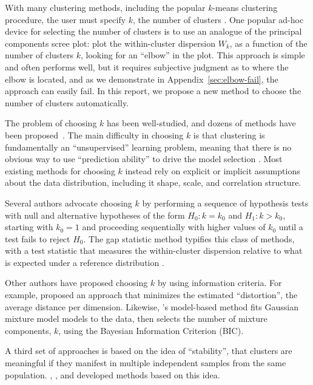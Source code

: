 \documentclass[12pt]{article}
\begin{document}
With many clustering methods, including the popular $k$-means clustering
procedure, the user must specify $k$, the number of clusters
\citep{jain2010data}.  One popular ad-hoc device for selecting the number of
clusters is to use an analogue of the principal components scree plot: plot
the within-cluster dispersion $W_k$, as a function of the number of clusters
$k$, looking for an ``elbow'' in the plot.  This approach is simple and often
performs well, but it requires subjective judgment as to where the elbow is
located, and as we demonstrate in Appendix~\ref{sec:elbow-fail}, the approach
can easily fail.  In this report, we propose a new method to choose the number
of clusters automatically.


The problem of choosing $k$ has been well-studied, and dozens of methods have
been proposed~\citep{chiang2010intelligent,fujita2014non}. The main difficulty
in choosing $k$ is that clustering is fundamentally an ``unsupervised''
learning problem, meaning that there is no obvious way to use ``prediction
ability'' to drive the model selection \citep{hastie2009elements}.  Most
existing methods for choosing $k$ instead rely on explicit or implicit
assumptions about the data distribution, including it shape, scale, and
correlation structure.


Several authors advocate choosing $k$ by performing a sequence of hypothesis
tests with null and alternative hypotheses of the form $H_0 : k = k_0$ and
$H_1: k > k_0$, starting with $k_0 = 1$ and proceeding sequentially with
higher values of $k_0$ until a test fails to reject $H_0$. The gap statistic
method typifies this class of methods, with a test statistic that measures the
within-cluster dispersion relative to what is expected under a reference
distribution \citep{tibshirani2001estimating}.


Other authors have proposed choosing $k$ by using information
criteria.  For example, \citet{sugar2003finding} proposed an approach that
minimizes the estimated ``distortion'', the average distance per dimension.
Likewise, \citet{fraley2002model}'s model-based method fits Gaussian mixture model
models to the data, then selects the number of mixture components, $k$, using
the Bayesian Information Criterion (BIC).


A third set of approaches is based on the idea of ``stability'', that clusters
are meaningful if they manifest in multiple independent samples from the same
population. \citet{ben2001stability}, \citet{tibshirani2005cluster},
\citet{wang2010consistent} and \citet{fang2012selection} developed methods
based on this idea.
\end{document}
